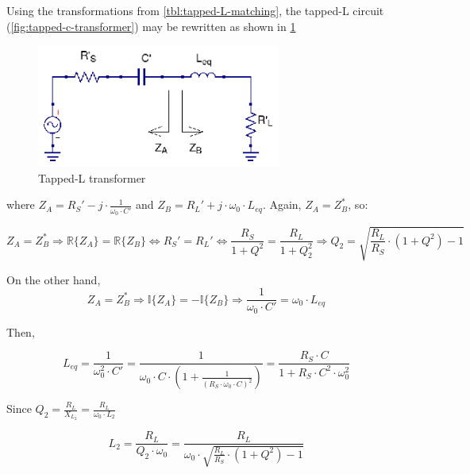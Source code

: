 \noindent Using the transformations from \ref{tbl:tapped-L-matching}, the tapped-L circuit (\ref{fig:tapped-c-transformer}) may be rewritten as shown in \ref{fig:tapped-c-transformer-equivalent}

\begin{figure}[H]
\centering
\includegraphics[width=80mm]{Tapped-L-equivalent}
\caption{Tapped-L transformer}
\label{fig:tapped-c-transformer-equivalent}
\end{figure}

\noindent where $Z_A = R_S' - j \cdot \frac{1}{\omega_0 \cdot C'}$ and $Z_B = R_L' + j \cdot \omega_0 \cdot L_{eq}$. Again, $Z_A = Z_B^*$, so:

\begin{equation}
Z_A = Z_B^* \Longrightarrow \mathbb{R} \lbrace Z_A \rbrace  = \mathbb{R} \lbrace Z_B \rbrace \Longleftrightarrow R_S' = R_L' \Longleftrightarrow \frac{R_S}{1 + Q^2} = \frac{R_L}{1 + Q_2^2} \Longrightarrow Q_2 = \sqrt{\frac{R_L}{R_S} \cdot (1 + Q^2) - 1}
\end{equation}

\noindent On the other hand,
\begin{equation}
Z_A = Z_B^* \Longrightarrow \mathbb{I} \lbrace Z_A \rbrace  = -\mathbb{I} \lbrace Z_B \rbrace \Longrightarrow \frac{1}{\omega_0 \cdot C'} = \omega_0 \cdot L_{eq}
\end{equation}

\noindent Then,

\begin{equation}
L_{eq} = \frac{1}{\omega_0^2 \cdot C'} = \frac{1}{\omega_0 \cdot C \cdot \left( 1 + \frac{1}{(R_S \cdot \omega_0 \cdot C)^2}\right)} = \frac{R_S \cdot C}{1 + R_S \cdot C^2 \cdot \omega_0^2}
\end{equation}

\noindent Since $Q_2 = \frac{R_L}{X_{L_2}} = \frac{R_L}{\omega_0 \cdot L_2}$

\begin{equation}
L_2 = \frac{R_L}{Q_2 \cdot \omega_0} = \frac{R_L}{\omega_0 \cdot \sqrt{\frac{R_L}{R_S} \cdot (1 + Q^2) - 1}}
\end{equation}

